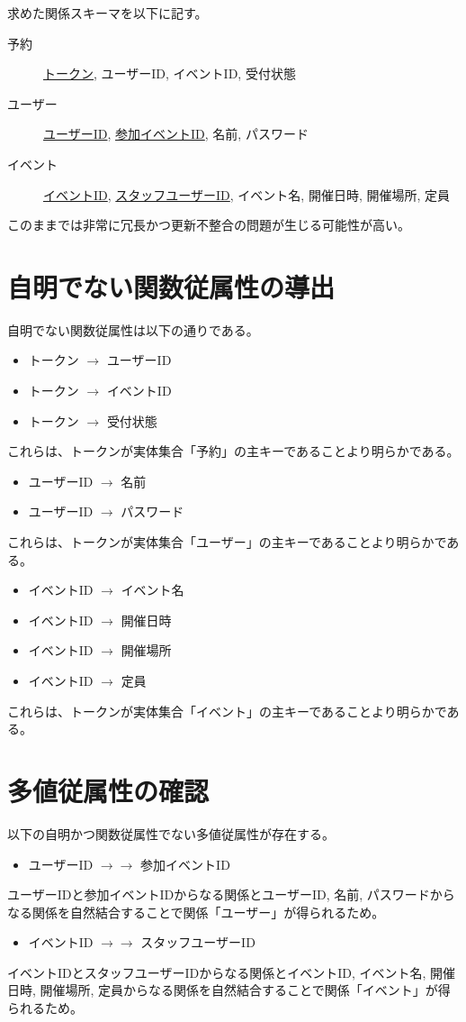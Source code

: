 \documentclass[dvipdfmx]{jarticle}
\begin{document}
求めた関係スキーマを以下に記す。

\begin{description}
  \item[予約] \underline{トークン}, ユーザーID, イベントID, 受付状態
  \item[ユーザー] \underline{ユーザーID}, \underline{参加イベントID}, 名前, パスワード
  \item[イベント] \underline{イベントID}, \underline{スタッフユーザーID}, イベント名, 開催日時, 開催場所, 定員 
\end{description}

このままでは非常に冗長かつ更新不整合の問題が生じる可能性が高い。

\section{自明でない関数従属性の導出}
自明でない関数従属性は以下の通りである。
\begin{itemize}
  \item {トークン} $\rightarrow$ {ユーザーID}
  \item {トークン} $\rightarrow$ {イベントID}
  \item {トークン} $\rightarrow$ {受付状態}
\end{itemize}
これらは、トークンが実体集合「予約」の主キーであることより明らかである。
\begin{itemize}
  \item {ユーザーID} $\rightarrow$ {名前}
  \item {ユーザーID} $\rightarrow$ {パスワード}
\end{itemize}
これらは、トークンが実体集合「ユーザー」の主キーであることより明らかである。
\begin{itemize}
  \item {イベントID} $\rightarrow$ {イベント名}
  \item {イベントID} $\rightarrow$ {開催日時}
  \item {イベントID} $\rightarrow$ {開催場所}
  \item {イベントID} $\rightarrow$ {定員}
\end{itemize}
これらは、トークンが実体集合「イベント」の主キーであることより明らかである。

\section{多値従属性の確認}
以下の自明かつ関数従属性でない多値従属性が存在する。
\begin{itemize}
  \item {ユーザーID} $\rightarrow \rightarrow$ {参加イベントID}
\end{itemize}
ユーザーIDと参加イベントIDからなる関係とユーザーID, 名前, パスワードからなる関係を自然結合することで関係「ユーザー」が得られるため。
\begin{itemize}
  \item {イベントID} $\rightarrow \rightarrow$ {スタッフユーザーID}
\end{itemize}
イベントIDとスタッフユーザーIDからなる関係とイベントID, イベント名, 開催日時, 開催場所, 定員からなる関係を自然結合することで関係「イベント」が得られるため。
\end{document}
